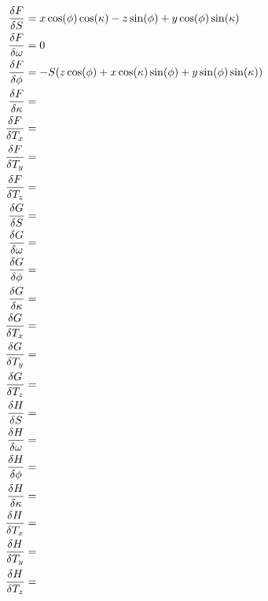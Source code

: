 \begin{align*}
\ddx{F}{S} &= x\cos(\phi)\cos(\kappa) - z\sin(\phi) + y\cos(\phi)\sin(\kappa)\\
\ddx{F}{\omega} &= 0\\
\ddx{F}{\phi} &= -S(z\cos(\phi) + x\cos(\kappa)\sin(\phi) + y\sin(\phi)\sin(\kappa))\\
\ddx{F}{\kappa} &= \\
\ddx{F}{T_x} &= \\
\ddx{F}{T_y} &= \\
\ddx{F}{T_z} &= \\
\ddx{G}{S} &= \\
\ddx{G}{\omega} &= \\
\ddx{G}{\phi} &= \\
\ddx{G}{\kappa} &= \\
\ddx{G}{T_x} &= \\
\ddx{G}{T_y} &= \\
\ddx{G}{T_z} &= \\
\ddx{H}{S} &= \\
\ddx{H}{\omega} &= \\
\ddx{H}{\phi} &= \\
\ddx{H}{\kappa} &= \\
\ddx{H}{T_x} &= \\
\ddx{H}{T_y} &= \\
\ddx{H}{T_z} &= 
\end{align*}
